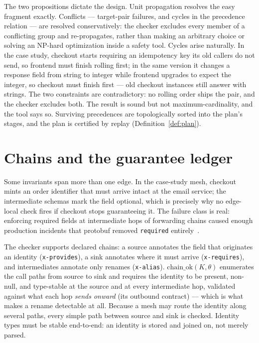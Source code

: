 The two propositions dictate the design. Unit propagation resolves the
easy fragment exactly. Conflicts --- target-pair failures, and cycles
in the precedence relation --- are resolved conservatively: the
checker excludes every member of a conflicting group and
re-propagates, rather than making an arbitrary choice or solving an
NP-hard optimization inside a safety tool. Cycles arise naturally. In
the case study, checkout starts requiring an idempotency key its old
callers do not send, so frontend must finish rolling first; in the
same version it changes a response field from string to integer while
frontend upgrades to expect the integer, so checkout must finish first
--- old checkout instances still answer with strings. The two
constraints are contradictory: no rolling order ships the pair, and
the checker excludes both. The result is sound but not maximum-cardinality, and the
tool says so. Surviving precedences are topologically sorted into the
plan's stages, and the plan is certified by replay
(Definition~\ref{def:plan}).

\section{Chains and the guarantee ledger}
\label{sec:ledger}

Some invariants span more than one edge. In the case-study mesh,
checkout mints an order identifier that must arrive intact at the
email service; the intermediate schemas mark the field optional, which
is precisely why no edge-local check fires if checkout stops
guaranteeing it. The failure class is real: enforcing required fields
at intermediate hops of forwarding chains caused enough production
incidents that protobuf removed \texttt{required}
entirely~\cite{protobufrequired}.

The checker supports declared chains: a source annotates the field
that originates an identity (\texttt{x-provides}), a sink annotates
where it must arrive (\texttt{x-requires}), and intermediates annotate
only renames (\texttt{x-alias}). $\mathrm{chain\_ok}(K, \theta)$
enumerates the call paths from source to sink and requires the
identity to be present, non-null, and type-stable at the source and at
every intermediate hop, validated against what each hop \emph{sends
onward} (its outbound contract) --- which is what makes a rename
detectable at all. Because a mesh may route the identity along several
paths, every simple path between source and sink is checked.
Identity types must be stable end-to-end: an identity is stored and
joined on, not merely parsed.

